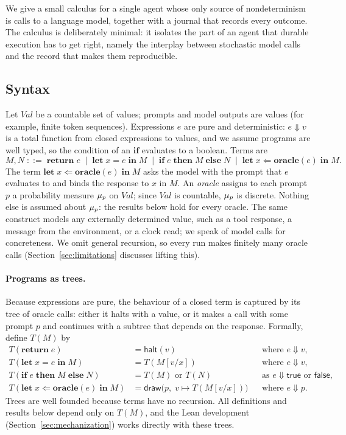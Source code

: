 
We give a small calculus for a single agent whose only source of nondeterminism is calls to
a language model, together with a journal that records every outcome.
The calculus is deliberately minimal: it isolates the part of an agent that durable
execution has to get right, namely the interplay between stochastic model calls and the
record that makes them reproducible.

\subsection{Syntax}
\label{sec:syntax}

Let $\mathit{Val}$ be a countable set of values; prompts and model outputs are values (for
example, finite token sequences).
Expressions $e$ are pure and deterministic: $e \Downarrow v$ is a total function from closed
expressions to values, and we assume programs are well typed, so the condition of an
$\mathbf{if}$ evaluates to a boolean.
Terms are
\[
  M, N \;::=\; \mathbf{return}\;e
    \;\mid\; \mathbf{let}\;x = e\;\mathbf{in}\;M
    \;\mid\; \mathbf{if}\;e\;\mathbf{then}\;M\;\mathbf{else}\;N
    \;\mid\; \mathbf{let}\;x \Leftarrow \mathbf{oracle}(e)\;\mathbf{in}\;M .
\]
The term $\mathbf{let}\;x \Leftarrow \mathbf{oracle}(e)\;\mathbf{in}\;M$ asks the model with
the prompt that $e$ evaluates to and binds the response to $x$ in $M$.
An \emph{oracle} assigns to each prompt $p$ a probability measure $\mu_{p}$ on
$\mathit{Val}$; since $\mathit{Val}$ is countable, $\mu_{p}$ is discrete.
Nothing else is assumed about $\mu_{p}$: the results below hold for every oracle.
The same construct models any externally determined value, such as a tool response, a
message from the environment, or a clock read; we speak of model calls for concreteness.
We omit general recursion, so every run makes finitely many oracle calls
(Section~\ref{sec:limitations} discusses lifting this).

\paragraph{Programs as trees.}
Because expressions are pure, the behaviour of a closed term is captured by its tree of
oracle calls: either it halts with a value, or it makes a call with some prompt $p$ and
continues with a subtree that depends on the response.
Formally, define $T(M)$ by
\begin{align*}
  T(\mathbf{return}\;e) &= \mathsf{halt}(v) && \text{where } e \Downarrow v,\\
  T(\mathbf{let}\;x = e\;\mathbf{in}\;M) &= T(M[v/x]) && \text{where } e \Downarrow v,\\
  T(\mathbf{if}\;e\;\mathbf{then}\;M\;\mathbf{else}\;N) &= T(M) \text{ or } T(N) && \text{as } e \Downarrow \mathsf{true} \text{ or } \mathsf{false},\\
  T(\mathbf{let}\;x \Leftarrow \mathbf{oracle}(e)\;\mathbf{in}\;M) &= \mathsf{draw}\bigl(p,\; v \mapsto T(M[v/x])\bigr) && \text{where } e \Downarrow p.
\end{align*}
Trees are well founded because terms have no recursion.
All definitions and results below depend only on $T(M)$, and the Lean development
(Section~\ref{sec:mechanization}) works directly with these trees.

